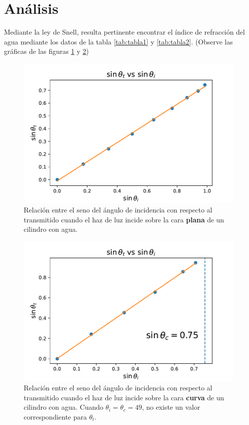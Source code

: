 \documentclass[
aps,
reprint,
amsmath, amssymb,
superscriptaddress,
]{revtex4-2}
\begin{document}
\section{Análisis}

Mediante la ley de Snell, resulta pertinente encontrar el índice de refracción del agua mediante los datos de la tabla \ref{tab:tabla1} y \ref{tab:tabla2}. (Observe las gráficas de las figuras \ref{fig:grafica0} y \ref{fig:grafica1})

\begin{figure}
\centering
\includegraphics[width=\columnwidth]{img/grafica0.pdf}
\caption{\label{fig:grafica0}Relación entre el seno del ángulo de incidencia con respecto al transmitido cuando el haz de luz incide sobre la cara \textbf{plana} de un cilindro con agua.}
\end{figure}

\begin{figure}
\centering
\includegraphics[width=\columnwidth]{img/grafica1.pdf}
\caption{\label{fig:grafica1}Relación entre el seno del ángulo de incidencia con respecto al transmitido cuando el haz de luz incide sobre la cara \textbf{curva} de un cilindro con agua. Cuando $\theta_i=\theta_c=49$, no existe un valor correspondiente para $\theta_t$.}
\end{figure}
\end{document}
